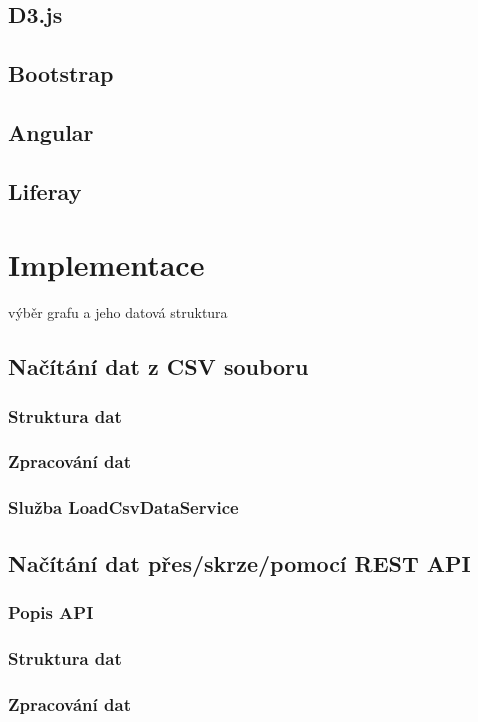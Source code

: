 \documentclass[
  digital, %
  oneside, %
  table,   %
  nolof,     %
  nolot,     %
]{fithesis3}
\begin{document}
\section{D3.js}
\section{Bootstrap}
\section{Angular}
\section{Liferay}

\chapter{Implementace}
výběr grafu a jeho datová struktura

\section{Načítání dat z CSV souboru}
\subsection{Struktura dat}
\subsection{Zpracování dat}
\subsection{Služba LoadCsvDataService}

\section{Načítání dat přes/skrze/pomocí REST API}
\subsection{Popis API}
\subsection{Struktura dat}
\subsection{Zpracování dat}
\end{document}
